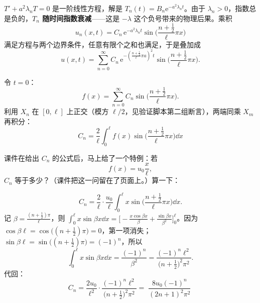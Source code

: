 \documentclass[11pt]{ctexart}
\let\origsubhdr\subhdr
\renewcommand{\subhdr}[1]{\par\needspace{3\baselineskip}\origsubhdr{#1}}
\begin{document}
$T'+a^2\lambda_nT=0$ 是一阶线性方程，解是 $T_n(t)=B_n\mathrm e^{-a^2\lambda_n t}$。由于 $\lambda_n>0$，指数总是负的，\textbf{$T_n$ 随时间指数衰减}——这是 $-\lambda$ 这个负号带来的物理后果。乘积
\begin{equation}
  u_n(x,t)=C_n\,\mathrm e^{-a^2\lambda_n t}\sin\Big(\frac{n+\frac12}{\ell}\pi x\Big)
\end{equation}
满足方程与两个边界条件，任意有限个之和也满足，于是叠加成
\begin{equation}
  u(x,t)=\sum_{n=0}^{\infty}C_n\,\mathrm e^{-\left(\frac{n+\frac12}{\ell}\pi a\right)^2t}
  \sin\Big(\frac{n+\frac12}{\ell}\pi x\Big).
\end{equation}

令 $t=0$：
\begin{equation}
  f(x)=\sum_{n=0}^{\infty}C_n\sin\Big(\frac{n+\frac12}{\ell}\pi x\Big).
\end{equation}
利用 $X_n$ 在 $[0,\ell]$ 上正交（模方 $\ell/2$，见验证脚本第二组断言），两端同乘 $X_m$ 再积分：
\begin{equation}
  \boxed{\;C_n=\frac{2}{\ell}\int_0^{\ell}f(x)\sin\Big(\frac{n+\frac12}{\ell}\pi x\Big)\dd x\;}
\end{equation}

\label{sec:c-n}

课件在给出 $C_n$ 的公式后，马上给了一个特例：若
\begin{equation}
  f(x)=u_0\frac{x}{\ell},
\end{equation}
$C_n$ 等于多少？（课件把这一问留在了页面上。）算一下：

\begin{equation}
  C_n=\frac{2}{\ell}\cdot\frac{u_0}{\ell}\int_0^{\ell}x\sin\Big(\frac{n+\frac12}{\ell}\pi x\Big)\dd x .
\end{equation}
记 $\beta=\frac{(n+\frac12)\pi}{\ell}$，则 $\int_0^{\ell}x\sin\beta x\dd x=\Big[-\frac{x\cos\beta x}{\beta}+\frac{\sin\beta x}{\beta^2}\Big]_0^{\ell}$。因为 $\cos\beta\ell=\cos\big((n+\frac12)\pi\big)=0$，第一项消失；$\sin\beta\ell=\sin\big((n+\frac12)\pi\big)=(-1)^n$，所以
\begin{equation}
  \int_0^{\ell}x\sin\beta x\dd x=\frac{(-1)^n}{\beta^2}=\frac{(-1)^n\ell^2}{\big(n+\frac12\big)^2\pi^2}.
\end{equation}
代回：
\begin{equation}
  C_n=\frac{2u_0}{\ell^2}\cdot\frac{(-1)^n\ell^2}{\big(n+\frac12\big)^2\pi^2}
  =\boxed{\;\frac{8u_0(-1)^n}{(2n+1)^2\pi^2}\;}
\end{equation}
\end{document}
